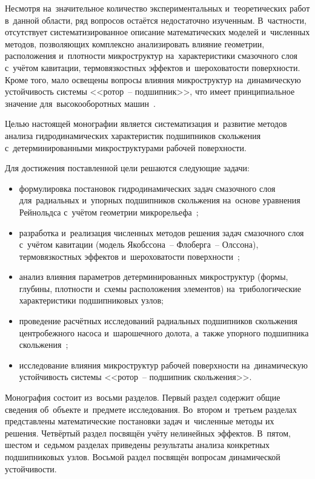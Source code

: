 Несмотря на~значительное количество экспериментальных и~теоретических работ в~данной области, ряд вопросов остаётся недостаточно изученным. В~частности, отсутствует систематизированное описание математических моделей и~численных методов, позволяющих комплексно анализировать влияние геометрии, расположения и~плотности микроструктур на~характеристики смазочного слоя с~учётом кавитации, термовязкостных эффектов и~шероховатости поверхности. Кроме того, мало освещены вопросы влияния микроструктур на~динамическую устойчивость системы <<ротор~-- подшипник>>, что имеет принципиальное значение для~высокооборотных машин~\cite{bashmur2024a,muszynska1988}.

Целью настоящей монографии является систематизация и~развитие методов анализа гидродинамических характеристик подшипников скольжения с~детерминированными микроструктурами рабочей поверхности.

Для достижения поставленной цели решаются следующие задачи:
\begin{itemize}
\item формулировка постановок гидродинамических задач смазочного слоя для~радиальных и~упорных подшипников скольжения на~основе уравнения Рейнольдса с~учётом геометрии микрорельефа~\cite{hori2002,senatore2018};
\item разработка и~реализация численных методов решения задач смазочного слоя с~учётом кавитации (модель Якобссона~-- Флоберга~-- Олссона), термовязкостных эффектов и~шероховатости поверхности~\cite{elrod1975,guo2005};
\item анализ влияния параметров детерминированных микроструктур (формы, глубины, плотности и~схемы расположения элементов) на~трибологические характеристики подшипниковых узлов;
\item проведение расчётных исследований радиальных подшипников скольжения центробежного насоса и~шарошечного долота, а~также упорного подшипника скольжения~\cite{bashmur2024a,petrovsky2020};
\item исследование влияния микроструктур рабочей поверхности на~динамическую устойчивость системы <<ротор~-- подшипник скольжения>>.
\end{itemize}

Монография состоит из~восьми разделов. Первый раздел содержит общие сведения об~объекте и~предмете исследования. Во~втором и~третьем разделах представлены математические постановки задач и~численные методы их решения. Четвёртый раздел посвящён учёту нелинейных эффектов. В~пятом, шестом и~седьмом разделах приведены результаты анализа конкретных подшипниковых узлов. Восьмой раздел посвящён вопросам динамической устойчивости.
